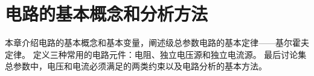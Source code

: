 \chapter{电路的基本概念和分析方法}

本章介绍电路的基本概念和基本变量，阐述级总参数电路的基本定律——基尔霍夫定律。
定义三种常用的电路元件：电阻、独立电压源和独立电流源。
最后讨论集总参数中，电压和电流必须满足的两类约束以及电路分析的基本方法。


